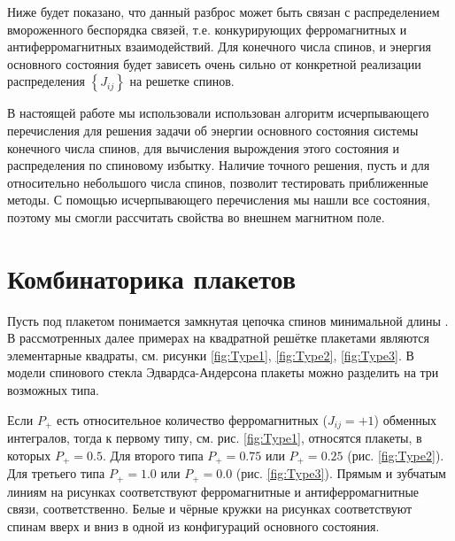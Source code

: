 \documentclass[utf8, babel, sor, jor, amsmath, amssymb, reprint]{elsarticle} %
\begin{document}
Ниже будет показано, что данный разброс может быть связан с распределением вмороженного беспорядка связей, т.е. конкурирующих ферромагнитных и антиферромагнитных взаимодействий. 
Для конечного числа спинов, и энергия основного состояния будет зависеть очень сильно от конкретной реализации распределения $\left\lbrace J_{ij} \right\rbrace $ на решетке спинов. 

В настоящей работе мы использовали использован алгоритм исчерпывающего перечисления \cite{dias2023ground, padalko2021parallel} для решения задачи об энергии основного состояния системы конечного числа спинов, для вычисления вырождения этого состояния и распределения по спиновому избытку. Наличие точного решения, пусть и для относительно небольшого числа спинов, позволит тестировать приближенные методы. С помощью исчерпывающего перечисления мы нашли все состояния, поэтому мы смогли рассчитать свойства во внешнем магнитном поле. 



\section{Комбинаторика плакетов}

Пусть под плакетом понимается замкнутая цепочка спинов минимальной длины \cite{lebrecht2015j}. В рассмотренных далее примерах на квадратной решётке плакетами являются элементарные квадраты, см. рисунки \ref{fig:Type1}, \ref{fig:Type2}, \ref{fig:Type3}. В модели спинового стекла Эдвардса-Андерсона плакеты можно разделить на три возможных типа. 

Если $P_+$ есть относительное количество ферромагнитных ($J_{ij}=+1$) обменных интегралов, тогда к первому типу, см. рис. \ref{fig:Type1}, относятся плакеты, в которых $P_+=0.5$. Для второго типа $P_+=0.75$ или $P_+=0.25$ (рис. \ref{fig:Type2}). Для третьего типа $P_+=1.0$ или $P_+=0.0$ (рис. \ref{fig:Type3}). Прямым и зубчатым линиям на рисунках соответствуют ферромагнитные и антиферромагнитные связи, соответственно. Белые и чёрные кружки на рисунках соответствуют спинам вверх и вниз в одной из конфигураций основного состояния.
\end{document}
